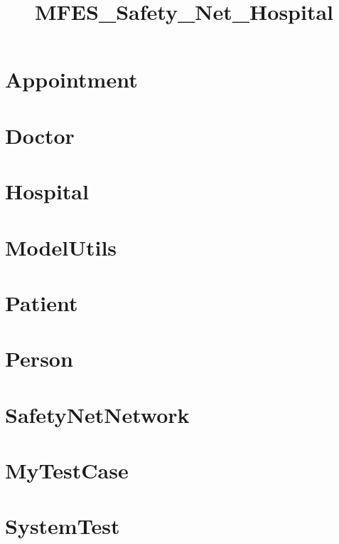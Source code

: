 \documentclass{article}
\begin{document}
\title{MFES\_Safety\_Net\_Hospital}
\author{}
\maketitle
\tableofcontents

\section{Appointment}

\section{Doctor}

\section{Hospital}

\section{ModelUtils}

\section{Patient}

\section{Person}

\section{SafetyNetNetwork}

\section{MyTestCase}

\section{SystemTest}

\end{document}
